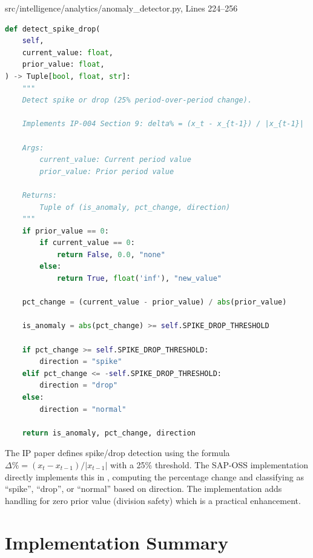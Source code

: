 \begin{implbox}{src/intelligence/analytics/anomaly\_detector.py, Lines 224--256}
\begin{lstlisting}[language=Python]
def detect_spike_drop(
    self,
    current_value: float,
    prior_value: float,
) -> Tuple[bool, float, str]:
    """
    Detect spike or drop (25% period-over-period change).
    
    Implements IP-004 Section 9: delta% = (x_t - x_{t-1}) / |x_{t-1}|
    
    Args:
        current_value: Current period value
        prior_value: Prior period value
        
    Returns:
        Tuple of (is_anomaly, pct_change, direction)
    """
    if prior_value == 0:
        if current_value == 0:
            return False, 0.0, "none"
        else:
            return True, float('inf'), "new_value"
    
    pct_change = (current_value - prior_value) / abs(prior_value)
    
    is_anomaly = abs(pct_change) >= self.SPIKE_DROP_THRESHOLD
    
    if pct_change >= self.SPIKE_DROP_THRESHOLD:
        direction = "spike"
    elif pct_change <= -self.SPIKE_DROP_THRESHOLD:
        direction = "drop"
    else:
        direction = "normal"
    
    return is_anomaly, pct_change, direction
\end{lstlisting}
\end{implbox}

\begin{adaptbox}
The IP paper defines spike/drop detection using the formula $\Delta\% = (x_t - x_{t-1}) / |x_{t-1}|$ with a 25\% threshold. The SAP-OSS implementation directly implements this in , computing the percentage change and classifying as ``spike'', ``drop'', or ``normal'' based on direction. The implementation adds handling for zero prior value (division safety) which is a practical enhancement.
\end{adaptbox}

\section{Implementation Summary}

